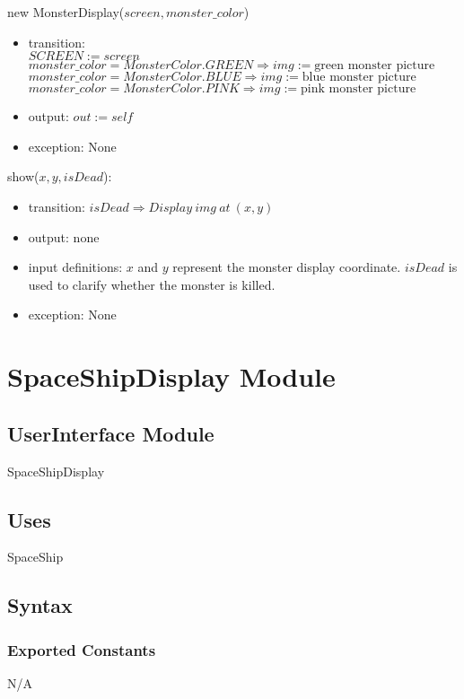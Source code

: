 \documentclass[12pt]{article}
\begin{document}
new MonsterDisplay($screen, monster\_color$)
\begin{itemize}
    \item transition: \\$SCREEN := screen$
    \\$monster\_color = MonsterColor.GREEN \Rightarrow img := \text{green monster picture}$
    \\$monster\_color = MonsterColor.BLUE \Rightarrow img := \text{blue monster picture}$
    \\$monster\_color = MonsterColor.PINK \Rightarrow img := \text{pink monster picture}$
    \item output: $out := \mathit{self}$
    \item exception: None
\end{itemize}

\noindent show($x, y, isDead$):
\begin{itemize}
    \item transition:
    $isDead \Rightarrow Display\ img\ at\ (x, y)$
    \item output: none
    \item input definitions: $x$ and $y$ represent the monster display coordinate. $isDead$ is used to clarify whether the monster is killed.
    \item exception: None
\end{itemize}
\newpage

\section{SpaceShipDisplay Module}

\subsection*{UserInterface Module}
SpaceShipDisplay
\subsection*{Uses}
SpaceShip

\subsection*{Syntax}
\subsubsection*{Exported Constants}
N/A
\end{document}
